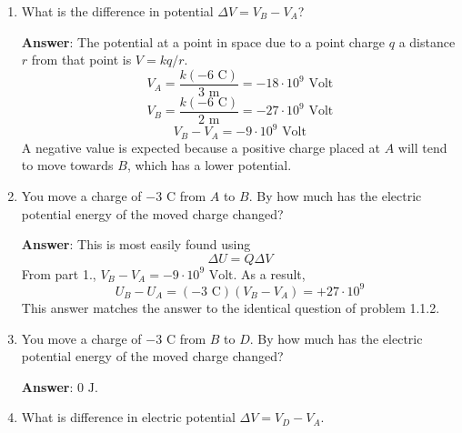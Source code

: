 \documentclass{article}
\begin{document}
\begin{enumerate}

  \item What is the difference in potential $\Delta V = V_B-V_A$?

        \ifsolutions
        \textbf{Answer}:
        The potential at a point in space due to a point charge $q$ a distance $r$ from that point is $V={kq}/{r}$.
        \begin{equation}
        V_A=\frac{k(-6\text{ C})}{3\text { m}}=-18\cdot 10^9\text{ Volt}
        \end{equation}
        \begin{equation}
        V_B=\frac{k(-6\text{ C})}{2\text { m}}=-27\cdot 10^9\text{ Volt}
        \end{equation}
        \begin{equation}
        V_B-V_A=-9\cdot 10^9\text{ Volt}
        \end{equation}
        A negative value is expected because a positive charge placed at $A$ will tend to move towards $B$, which has a lower potential.
        \else
        \vskip 48pt
        \fi

  \item You move a charge of $-3\text{ C}$ from $A$ to $B$. By how much has the electric potential energy of the moved charge changed?

        \ifsolutions
        \textbf{Answer}:
        This is most easily found using
        \begin{equation}
        \Delta U = Q{\Delta V}
        \end{equation}
        From part 1., $V_B-V_A=-9\cdot 10^9\text{ Volt}$. As a result, 
        \begin{equation}
        U_B-U_A= (-3\text{ C})(V_B-V_A)=+27\cdot 10^9
        \end{equation}
        This answer matches the answer to the identical question of problem 1.1.2.
        \else
        \vskip 48pt
        \fi

  \item You move a charge of $-3\text{ C}$ from $B$ to $D$. By how much has the electric potential energy of the moved charge changed?

        \ifsolutions
        \textbf{Answer}: $0\text{ J}$.
        \else
        \vskip 48pt
        \fi

  \item What is difference in electric potential $\Delta V = V_D-V_A$.


\end{enumerate}
\end{document}
